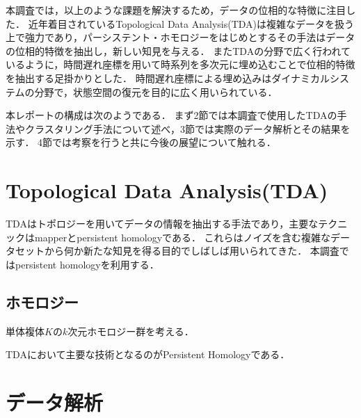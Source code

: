 \documentclass{jarticle}
\begin{document}
本調査では，以上のような課題を解決するため，データの位相的な特徴に注目した．
近年着目されているTopological Data Analysis(TDA)は複雑なデータを扱う上で強力であり，パーシステント・ホモロジーをはじめとするその手法はデータの位相的特徴を抽出し，新しい知見を与える．
またTDAの分野で広く行われているように，時間遅れ座標を用いて時系列を多次元に埋め込むことで位相的特徴を抽出する足掛かりとした．
時間遅れ座標による埋め込みはダイナミカルシステムの分野で，状態空間の復元を目的に広く用いられている．

本レポートの構成は次のようである．
まず2節では本調査で使用したTDAの手法やクラスタリング手法について述べ，3節では実際のデータ解析とその結果を示す．
4節では考察を行うと共に今後の展望について触れる．

\section{Topological Data Analysis(TDA)}
TDAはトポロジーを用いてデータの情報を抽出する手法であり，主要なテクニックはmapperとpersistent homologyである．
これらはノイズを含む複雑なデータセットから何か新たな知見を得る目的でしばしば用いられてきた．
本調査ではpersistent homologyを利用する．

\subsection{ホモロジー}
単体複体$K$の$k$次元ホモロジー群を考える．





TDAにおいて主要な技術となるのがPersistent Homology\cite{Edelsbrunner2002}である．



\section{データ解析}
\end{document}
